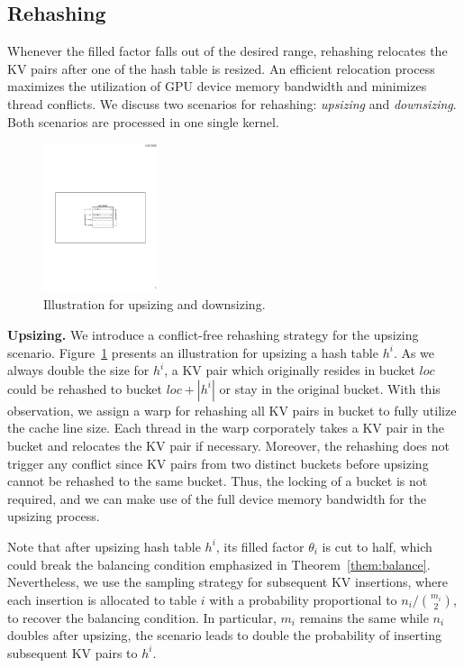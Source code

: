 \subsection{Rehashing}\label{sec:dyn:rehash}
Whenever the filled factor falls out of the desired range, rehashing relocates the KV pairs after one of the hash table is resized. An efficient relocation process maximizes the utilization of GPU device memory bandwidth and minimizes thread conflicts. 
We discuss two scenarios for rehashing: \emph{upsizing} and \emph{downsizing}. Both scenarios are processed in one single kernel. 

\begin{figure}[t]
	\centering
	\includegraphics[width=0.3\textwidth]{fig/Upsize.pdf}
	\caption{Illustration for upsizing and downsizing.}
	\label{fig:upsize}
\end{figure}
\vspace{1mm}\noindent\textbf{Upsizing.} 
We introduce a conflict-free rehashing strategy for the upsizing scenario. 
Figure~\ref{fig:upsize} presents an illustration for upsizing a hash table $h^i$. 
As we always double the size for $h^i$, 
a KV pair which originally resides in bucket $loc$ could be rehashed to bucket $loc+|h^i|$ or stay in the original bucket. 
With this observation, we assign a warp for rehashing all KV pairs in bucket to fully utilize the cache line size. 
Each thread in the warp corporately takes a KV pair in the bucket and relocates the KV pair if necessary.
Moreover, the rehashing does not trigger any conflict since KV pairs from two distinct buckets before upsizing cannot be rehashed to the same bucket.  
Thus, the locking of a bucket is not required, and we can make use of the full device memory bandwidth for the upsizing process.  

Note that after upsizing hash table $h^i$, its filled factor $\theta_i$ is cut to half, which could break the balancing condition emphasized in Theorem~\ref{them:balance}. Nevertheless, we use the sampling strategy for subsequent KV insertions, where each insertion is allocated to table $i$ with a probability proportional to $n_i/\binom{m_i}{2}$, to recover the balancing condition. In particular, $m_i$ remains the same while $n_i$ doubles after upsizing, the scenario leads to double the probability of inserting subsequent KV pairs to $h^i$. 


